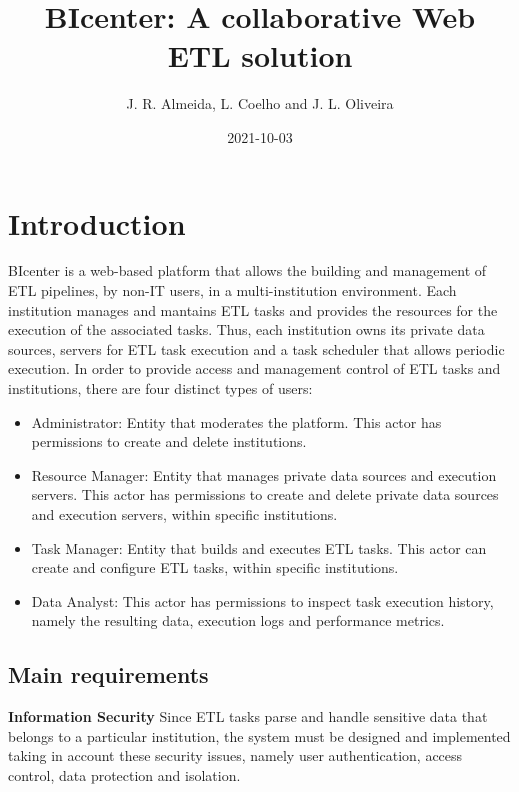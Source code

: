\documentclass[
  11pt,
]{krantz}
\title{BIcenter: A collaborative Web ETL solution}
\author{J. R. Almeida, L. Coelho and J. L. Oliveira}
\date{2021-10-03}
\providecommand{\tightlist}{%
  \setlength{\itemsep}{0pt}\setlength{\parskip}{0pt}}
\begin{document}
\maketitle

{
\hypersetup{linkcolor=}
\setcounter{tocdepth}{1}
\tableofcontents
}
\listoffigures
\listoftables
\mainmatter

\hypertarget{introduction}{%
\chapter{Introduction}\label{introduction}}

BIcenter is a web-based platform that allows the building and management of ETL pipelines, by non-IT users, in a multi-institution environment. Each institution manages and mantains ETL tasks and provides the resources for the execution of the associated tasks. Thus, each institution owns its private data sources, servers for ETL task execution and a task scheduler that allows periodic execution. In order to provide access and management control of ETL tasks and institutions, there are four distinct types of users:

\begin{itemize}
\tightlist
\item
  Administrator: Entity that moderates the platform. This actor has permissions to create and delete institutions.
\item
  Resource Manager: Entity that manages private data sources and execution servers. This actor has permissions to create and delete private data sources and execution servers, within specific institutions.
\item
  Task Manager: Entity that builds and executes ETL tasks. This actor can create and configure ETL tasks, within specific institutions.
\item
  Data Analyst: This actor has permissions to inspect task execution history, namely the resulting data, execution logs and performance metrics.
\end{itemize}

\hypertarget{main-requirements}{%
\section{Main requirements}\label{main-requirements}}

\textbf{Information Security}
Since ETL tasks parse and handle sensitive data that belongs to a particular institution, the system must be designed and implemented taking in account these security issues, namely user authentication, access control, data protection and isolation.
\end{document}
